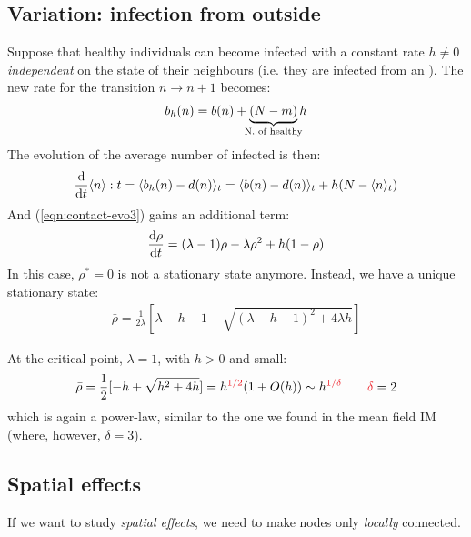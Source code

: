 \documentclass[../../main.tex]{subfiles}
\begin{document}
\subsection{Variation: infection from outside}
Suppose that healthy individuals can become infected with a constant rate $h \neq 0$ \textit{independent} on the state of their neighbours (i.e. they are infected from an ). The new rate for the transition $n \to n+1$ becomes:
\begin{align*}
    b_h(n) = b(n) + \underbrace{(N-m)}_{\mathclap{\text{N. of healthy}}}  h
\end{align*} 
The evolution of the average number of infected is then:
\begin{align*}
    \dv{t} \langle n \rangle:t = \langle b_h(n) - d(n) \rangle_t = \langle b(n) - d(n) \rangle_t + h(N - \langle n \rangle_t)
\end{align*}
And (\ref{eqn:contact-evo3}) gains an additional term:
\begin{align*}
    \dv{\rho}{t} = (\lambda - 1) \rho - \lambda \rho^2 + h(1-\rho)
\end{align*}
In this case, $\rho^* = 0$ is not a stationary state anymore. Instead, we have a unique stationary state:
\begin{align*}
    \bar{\rho} = \frac{1}{2 \lambda} [\lambda - h - 1 + \sqrt{(\lambda - h - 1)^2 + 4 \lambda h}]
\end{align*}

At the critical point, $\lambda = 1$, with $h > 0$ and small:
\begin{align*}
    \bar{\rho} = \frac{1}{2} [ - h + \sqrt{h^2 + 4h}]  = h^{\textcolor{Red}{1/2}} ( 1 + O(h) ) \sim h^{\textcolor{Red}{1/\delta}} \qquad \textcolor{Red}{\delta} = 2
\end{align*}
which is again a power-law, similar to the one we found in the mean field IM (where, however, $\delta = 3$).

\subsection{Spatial effects}
If we want to study \textit{spatial effects}, we need to make nodes only \textit{locally} connected.
\end{document}
